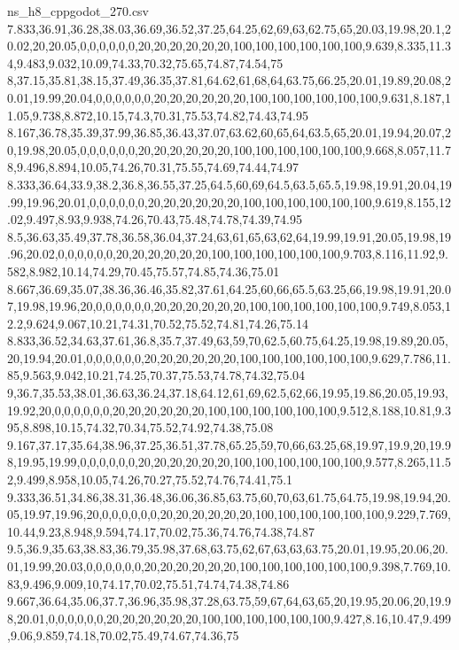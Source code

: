 \begin{filecontents*}[overwrite]{ns_h8_cppgodot_270.csv}
7.833,36.91,36.28,38.03,36.69,36.52,37.25,64.25,62,69,63,62.75,65,20.03,19.98,20.1,20.02,20,20.05,0,0,0,0,0,0,20,20,20,20,20,20,100,100,100,100,100,100,9.639,8.335,11.34,9.483,9.032,10.09,74.33,70.32,75.65,74.87,74.54,75
8,37.15,35.81,38.15,37.49,36.35,37.81,64.62,61,68,64,63.75,66.25,20.01,19.89,20.08,20.01,19.99,20.04,0,0,0,0,0,0,20,20,20,20,20,20,100,100,100,100,100,100,9.631,8.187,11.05,9.738,8.872,10.15,74.3,70.31,75.53,74.82,74.43,74.95
8.167,36.78,35.39,37.99,36.85,36.43,37.07,63.62,60,65,64,63.5,65,20.01,19.94,20.07,20,19.98,20.05,0,0,0,0,0,0,20,20,20,20,20,20,100,100,100,100,100,100,9.668,8.057,11.78,9.496,8.894,10.05,74.26,70.31,75.55,74.69,74.44,74.97
8.333,36.64,33.9,38.2,36.8,36.55,37.25,64.5,60,69,64.5,63.5,65.5,19.98,19.91,20.04,19.99,19.96,20.01,0,0,0,0,0,0,20,20,20,20,20,20,100,100,100,100,100,100,9.619,8.155,12.02,9.497,8.93,9.938,74.26,70.43,75.48,74.78,74.39,74.95
8.5,36.63,35.49,37.78,36.58,36.04,37.24,63,61,65,63,62,64,19.99,19.91,20.05,19.98,19.96,20.02,0,0,0,0,0,0,20,20,20,20,20,20,100,100,100,100,100,100,9.703,8.116,11.92,9.582,8.982,10.14,74.29,70.45,75.57,74.85,74.36,75.01
8.667,36.69,35.07,38.36,36.46,35.82,37.61,64.25,60,66,65.5,63.25,66,19.98,19.91,20.07,19.98,19.96,20,0,0,0,0,0,0,20,20,20,20,20,20,100,100,100,100,100,100,9.749,8.053,12.2,9.624,9.067,10.21,74.31,70.52,75.52,74.81,74.26,75.14
8.833,36.52,34.63,37.61,36.8,35.7,37.49,63,59,70,62.5,60.75,64.25,19.98,19.89,20.05,20,19.94,20.01,0,0,0,0,0,0,20,20,20,20,20,20,100,100,100,100,100,100,9.629,7.786,11.85,9.563,9.042,10.21,74.25,70.37,75.53,74.78,74.32,75.04
9,36.7,35.53,38.01,36.63,36.24,37.18,64.12,61,69,62.5,62,66,19.95,19.86,20.05,19.93,19.92,20,0,0,0,0,0,0,20,20,20,20,20,20,100,100,100,100,100,100,9.512,8.188,10.81,9.395,8.898,10.15,74.32,70.34,75.52,74.92,74.38,75.08
9.167,37.17,35.64,38.96,37.25,36.51,37.78,65.25,59,70,66,63.25,68,19.97,19.9,20,19.98,19.95,19.99,0,0,0,0,0,0,20,20,20,20,20,20,100,100,100,100,100,100,9.577,8.265,11.52,9.499,8.958,10.05,74.26,70.27,75.52,74.76,74.41,75.1
9.333,36.51,34.86,38.31,36.48,36.06,36.85,63.75,60,70,63,61.75,64.75,19.98,19.94,20.05,19.97,19.96,20,0,0,0,0,0,0,20,20,20,20,20,20,100,100,100,100,100,100,9.229,7.769,10.44,9.23,8.948,9.594,74.17,70.02,75.36,74.76,74.38,74.87
9.5,36.9,35.63,38.83,36.79,35.98,37.68,63.75,62,67,63,63,63.75,20.01,19.95,20.06,20.01,19.99,20.03,0,0,0,0,0,0,20,20,20,20,20,20,100,100,100,100,100,100,9.398,7.769,10.83,9.496,9.009,10,74.17,70.02,75.51,74.74,74.38,74.86
9.667,36.64,35.06,37.7,36.96,35.98,37.28,63.75,59,67,64,63,65,20,19.95,20.06,20,19.98,20.01,0,0,0,0,0,0,20,20,20,20,20,20,100,100,100,100,100,100,9.427,8.16,10.47,9.499,9.06,9.859,74.18,70.02,75.49,74.67,74.36,75

\end{filecontents*}
